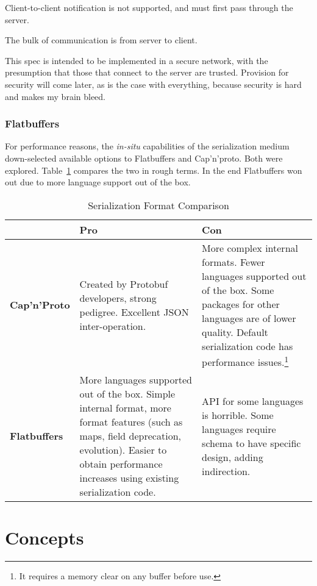 \documentclass[11pt, oneside]{amsart}
\begin{document}
Client-to-client notification is not supported, and must first pass through the server.

The bulk of communication is from server to client.

This spec is intended to be implemented in a secure network, with the presumption that those that connect to the server are trusted. Provision for security will come later, as is the case with everything, because security is hard and makes my brain bleed.

\subsubsection{Flatbuffers}

For performance reasons, the \textit{in-situ} capabilities of the serialization medium down-selected available options to Flatbuffers and Cap'n'proto. Both were explored. Table~\ref{tab:serial_comp} compares the two in rough terms. In the end Flatbuffers won out due to more language support out of the box.

\begin{table}[htbp]
\begin{tabularx}{.99\textwidth}{p{.9in}XX}
	\toprule
	~ & \textbf{Pro} & \textbf{Con} \\
	\midrule
	\textbf{Cap'n'Proto} & Created by Protobuf developers, strong pedigree. Excellent JSON inter-operation.  & More complex internal formats. Fewer languages supported out of the box. Some packages for other languages are of lower quality. Default serialization code has performance issues.\footnote{It requires a memory clear on any buffer before use.} \\
	\midrule
	\textbf{Flatbuffers} & More languages supported out of the box. Simple internal format, more format features (such as maps, field deprecation, evolution). Easier to obtain performance increases using existing serialization code. & API for some languages is horrible. Some languages require schema to have specific design, adding indirection. \\
	\bottomrule
\end{tabularx}
	\caption{Serialization Format Comparison}
	\label{tab:serial_comp}
\end{table}

\section{Concepts}
\end{document}
